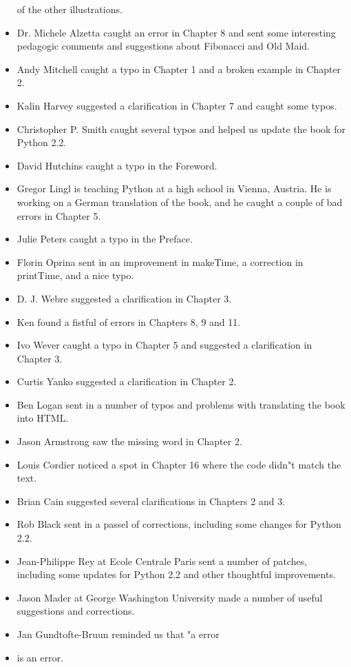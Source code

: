 \begin{itemize}
of the other illustrations. 
\item Dr. Michele Alzetta caught an error in Chapter 8 and sent some interesting
pedagogic comments and suggestions about Fibonacci and Old Maid.
\item Andy Mitchell caught a typo in Chapter 1 and a broken example in Chapter 2. 
\item Kalin Harvey suggested a clarification in Chapter 7 and caught some typos. 
\item Christopher P. Smith caught several typos and helped us update the book for Python 2.2. 
\item David Hutchins caught a typo in the Foreword. 
\item Gregor Lingl is teaching Python at a high school in Vienna, Austria. He is
working on a German translation of the book, and he caught a couple of bad
errors in Chapter 5.
\item Julie Peters caught a typo in the Preface. 
\item Florin Oprina sent in an improvement in makeTime, a correction in printTime, and a nice typo. 
\item D. J. Webre suggested a clarification in Chapter 3. 
\item Ken found a fistful of errors in Chapters 8, 9 and 11. 
\item Ivo Wever caught a typo in Chapter 5 and suggested a clarification in Chapter 3. 
\item Curtis Yanko suggested a clarification in Chapter 2. 
\item Ben Logan sent in a number of typos and problems with translating the book into HTML. 
\item Jason Armstrong saw the missing word in Chapter 2. 
\item Louis Cordier noticed a spot in Chapter 16 where the code didn"t match the text. 
\item Brian Cain suggested several clarifications in Chapters 2 and 3. 
\item Rob Black sent in a passel of corrections, including some changes for Python 2.2. 
\item Jean-Philippe Rey at Ecole Centrale Paris sent a number of patches, including some updates 
for Python 2.2 and other thoughtful improvements. 
\item Jason Mader at George Washington University made a number of useful suggestions and corrections. 
\item Jan Gundtofte-Bruun reminded us that "a error
\item is an error. 

\end{itemize}
